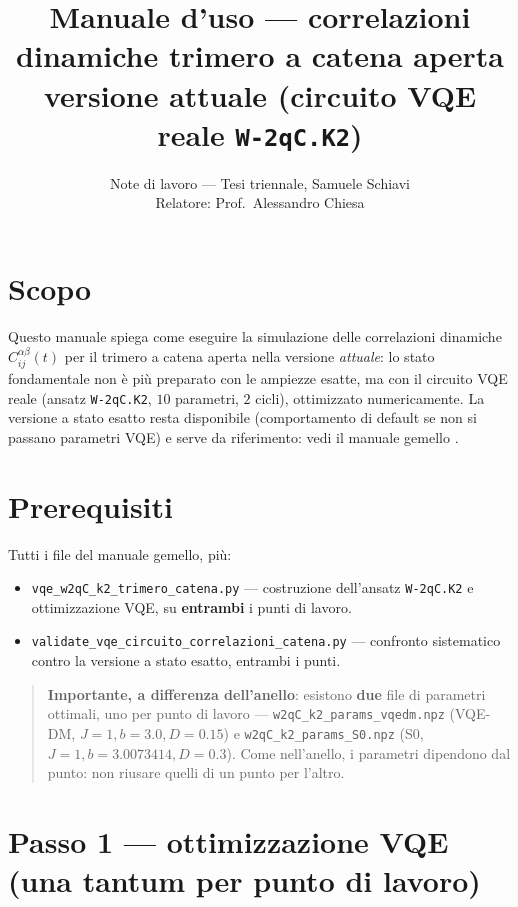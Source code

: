\documentclass[11pt,a4paper]{article}
\title{Manuale d'uso --- correlazioni dinamiche trimero a catena aperta\\
\large versione attuale (circuito VQE reale \texttt{W-2qC.K2})}
\author{Note di lavoro --- Tesi triennale, Samuele Schiavi\\ Relatore: Prof.\ Alessandro Chiesa}
\date{}
\begin{document}
\maketitle

\section*{Scopo}

Questo manuale spiega come eseguire la simulazione delle correlazioni dinamiche
$C_{ij}^{\alpha\beta}(t)$ per il trimero a catena aperta nella versione \emph{attuale}: lo
stato fondamentale non è più preparato con le ampiezze esatte, ma con il circuito VQE reale
(ansatz \texttt{W-2qC.K2}, $10$ parametri, $2$ cicli), ottimizzato numericamente. La versione a
stato esatto resta disponibile (comportamento di default se non si passano parametri VQE) e
serve da riferimento: vedi il manuale gemello
\texttt{}.

\section*{Prerequisiti}

Tutti i file del manuale gemello, più:
\begin{itemize}
\item \texttt{vqe\_w2qC\_k2\_trimero\_catena.py} --- costruzione dell'ansatz \texttt{W-2qC.K2}
e ottimizzazione VQE, su \textbf{entrambi} i punti di lavoro.
\item \texttt{validate\_vqe\_circuito\_correlazioni\_catena.py} --- confronto sistematico contro
la versione a stato esatto, entrambi i punti.
\end{itemize}

\begin{quote}
\textbf{Importante, a differenza dell'anello}: esistono \textbf{due} file di parametri
ottimali, uno per punto di lavoro --- \texttt{w2qC\_k2\_params\_vqedm.npz} (VQE-DM,
$J{=}1,b{=}3.0,D{=}0.15$) e \texttt{w2qC\_k2\_params\_S0.npz} (S0,
$J{=}1,b{=}3.0073414,D{=}0.3$). Come nell'anello, i parametri dipendono dal punto: non riusare
quelli di un punto per l'altro.
\end{quote}

\section*{Passo 1 --- ottimizzazione VQE (una tantum per punto di lavoro)}
\end{document}
